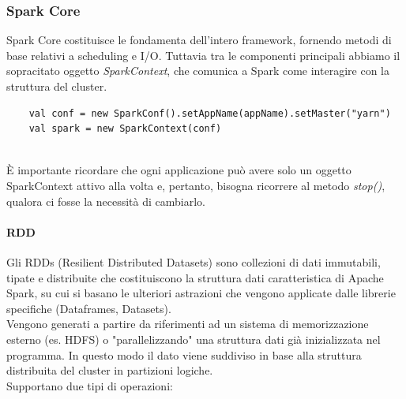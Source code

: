 \subsubsection{Spark Core}
Spark Core costituisce le fondamenta dell'intero framework, fornendo metodi di base relativi a scheduling e I/O. Tuttavia tra le componenti principali abbiamo il sopracitato oggetto \textit{SparkContext}, che comunica a Spark come interagire con la struttura del cluster.\\

\begin{code}
	\label{code:SparkContext}
	\begin{verbatim}
    val conf = new SparkConf().setAppName(appName).setMaster("yarn")
    val spark = new SparkContext(conf) 
	\end{verbatim}
\end{code}~\\
È importante ricordare che ogni applicazione può avere solo un oggetto SparkContext attivo alla volta e, pertanto, bisogna ricorrere al metodo \textit{stop()}, qualora ci fosse la necessità di cambiarlo.

\paragraph{RDD} Gli RDDs (Resilient Distributed Datasets) \cite{spark_rdd_doc} sono collezioni di dati immutabili, tipate e distribuite che costituiscono la struttura dati caratteristica di Apache Spark, su cui si basano le ulteriori astrazioni che vengono applicate dalle librerie specifiche (Dataframes, Datasets).\\
Vengono generati a partire da riferimenti ad un sistema di memorizzazione esterno (es. HDFS) o "parallelizzando" una struttura dati già inizializzata nel programma. In questo modo il dato viene suddiviso in base alla struttura distribuita del cluster in partizioni logiche.\\
Supportano due tipi di operazioni: 


